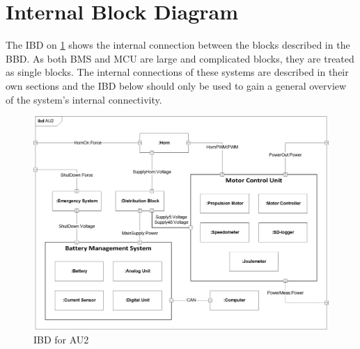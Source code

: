 \section{Internal Block Diagram}
The IBD on \ref{fig:IBD} shows the internal connection between the blocks described in the BBD. As both BMS and MCU are large and complicated blocks, they are treated as single blocks. The internal connections of these systems are described in their own sections and the IBD below should only be used to gain a general overview of the system's internal connectivity. 

\begin{figure}[H]
	\centering
	\includegraphics[width=1\linewidth]{Architecture/Diagrams/IBD_AU2}
	\caption{IBD for AU2}
	\label{fig:IBD}
\end{figure}